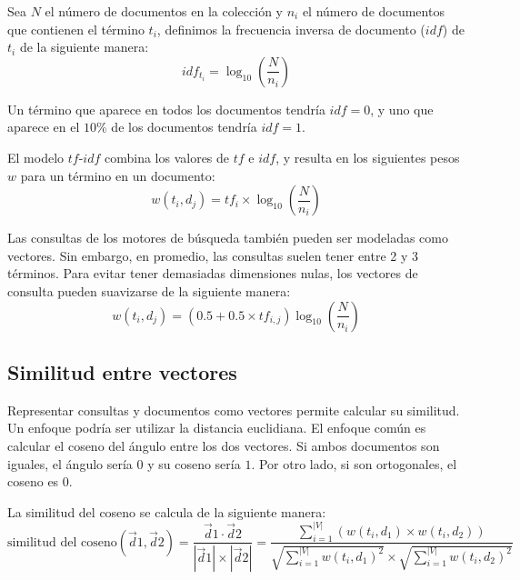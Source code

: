 \begin{definition}
Sea $N$ el número de documentos en la colección y $n_{i}$ el número de documentos que contienen el término $t_{i}$, definimos la frecuencia inversa de documento ($idf$) de $t_{i}$ de la siguiente manera:
\begin{displaymath}
idf_{t_{i}}= \log_{10}\left(\frac{N}{n_{i}}\right)
\end{displaymath}

\end{definition}

Un término que aparece en todos los documentos tendría $idf=0$, y uno que aparece en el $10\%$ de los documentos tendría $idf=1$. 

\begin{definition}
 El modelo $tf$-$idf$ combina los valores de $tf$ e $idf$, y resulta en los siguientes pesos $w$ para un término en un documento:
\begin{displaymath}
w(t_{i},d_{j})=tf_{i}\times \log_{10}\left(\frac{N}{n_{i}}\right)
\end{displaymath} 
\end{definition}



Las consultas de los motores de búsqueda también pueden ser modeladas como vectores. Sin embargo, en promedio, las consultas suelen tener entre 2 y 3 términos. Para evitar tener demasiadas dimensiones nulas, los vectores de consulta pueden suavizarse de la siguiente manera:
\begin{displaymath}
w(t_{i},d_{j})=(0.5+0.5\times tf_{i,j})\log_{10}\left(\frac{N}{n_{i}}\right)
\end{displaymath}

\subsection{Similitud entre vectores}
Representar consultas y documentos como vectores permite calcular su similitud. Un enfoque podría ser utilizar la distancia euclidiana. El enfoque común es calcular el coseno del ángulo entre los dos vectores. Si ambos documentos son iguales, el ángulo sería $0$ y su coseno sería $1$. Por otro lado, si son ortogonales, el coseno es $0$. 

\begin{definition}
La similitud del coseno se calcula de la siguiente manera:
\begin{displaymath}
\text{similitud del coseno}(\vec{d}{1},\vec{d}{2})= \frac{\vec{d}{1}\cdot \vec{d}{2}}{|\vec{d}{1}|\times|\vec{d}{2}|} = \frac{\sum_{i=1}^{|V|}(w(t_{i},d_{1})\times w(t_{i},d_{2}))}{\sqrt{\sum_{i=1}^{|V|} w(t_{i},d_{1})^2}\times \sqrt{\sum_{i=1}^{|V|} w(t_{i},d_{2})^2}}
\end{displaymath} 
\end{definition}




